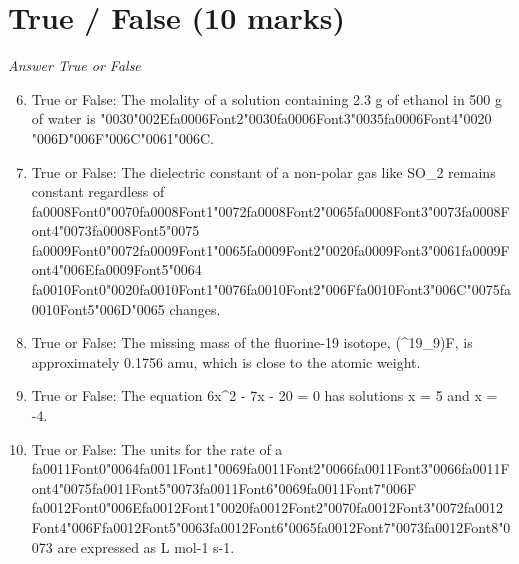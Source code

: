\documentclass[12pt]{article}
\begin{document}
\section*{True / False (10 marks)}
\textit{Answer True or False}
\begin{enumerate}[label=\arabic*.]
\setcounter{enumi}{5}
\item True or False: The molality of a solution containing 2.3 g of ethanol in 500 g of water is {\char"0030}{\char"002E}{\csname fa0006Font2\endcsname\char"0030}{\csname fa0006Font3\endcsname\char"0035}{\csname fa0006Font4\endcsname\char"0020} {\char"006D}{\char"006F}{\char"006C}{\char"0061}{\char"006C}.
\item True or False: The dielectric constant of a non-polar gas like SO\_2 remains constant regardless of {\csname fa0008Font0\endcsname\char"0070}{\csname fa0008Font1\endcsname\char"0072}{\csname fa0008Font2\endcsname\char"0065}{\csname fa0008Font3\endcsname\char"0073}{\csname fa0008Font4\endcsname\char"0073}{\csname fa0008Font5\endcsname\char"0075} {\csname fa0009Font0\endcsname\char"0072}{\csname fa0009Font1\endcsname\char"0065}{\csname fa0009Font2\endcsname\char"0020}{\csname fa0009Font3\endcsname\char"0061}{\csname fa0009Font4\endcsname\char"006E}{\csname fa0009Font5\endcsname\char"0064} {\csname fa0010Font0\endcsname\char"0020}{\csname fa0010Font1\endcsname\char"0076}{\csname fa0010Font2\endcsname\char"006F}{\csname fa0010Font3\endcsname\char"006C}{\char"0075}{\csname fa0010Font5\endcsname\char"006D}{\char"0065} changes.
\item True or False: The missing mass of the fluorine-19 isotope, (\^{}19\_9)F, is approximately 0.1756 amu, which is close to the atomic weight.
\item True or False: The equation 6x\^{}2 - 7x - 20 = 0 has solutions x = 5 and x = -4.
\item True or False: The units for the rate of a {\csname fa0011Font0\endcsname\char"0064}{\csname fa0011Font1\endcsname\char"0069}{\csname fa0011Font2\endcsname\char"0066}{\csname fa0011Font3\endcsname\char"0066}{\csname fa0011Font4\endcsname\char"0075}{\csname fa0011Font5\endcsname\char"0073}{\csname fa0011Font6\endcsname\char"0069}{\csname fa0011Font7\endcsname\char"006F} {\csname fa0012Font0\endcsname\char"006E}{\csname fa0012Font1\endcsname\char"0020}{\csname fa0012Font2\endcsname\char"0070}{\csname fa0012Font3\endcsname\char"0072}{\csname fa0012Font4\endcsname\char"006F}{\csname fa0012Font5\endcsname\char"0063}{\csname fa0012Font6\endcsname\char"0065}{\csname fa0012Font7\endcsname\char"0073}{\csname fa0012Font8\endcsname\char"0073} are expressed as L mol-1 s-1.
\end{enumerate}
\end{document}
